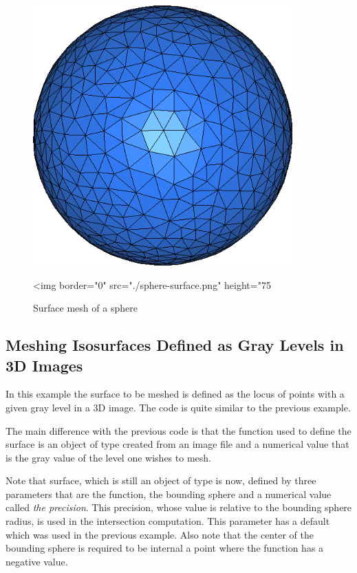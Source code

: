 \begin{figure}[ht]
  \begin{center}
    \begin{ccTexOnly}
      \includegraphics[height=10cm]{Surface_mesher/sphere-surface}
    \end{ccTexOnly}
    \begin{ccHtmlOnly}
      <img border="0" src="./sphere-surface.png" height="75%
    \end{ccHtmlOnly}
  \end{center}
  \caption{Surface mesh of a sphere}
  \label{figure:Surface_mesher-sphere-surface}
\end{figure}


\subsection{Meshing Isosurfaces Defined as Gray Levels in  3D Images}
In this example the surface to be meshed is defined
as the locus of points with a given gray level
in a 3D image.
The code is quite similar to the previous example.

The main difference with the previous code
is that the function used to define the surface
is  an object of type   created from
an image file and a numerical value that is  the
 gray value of the level one wishes to mesh.

Note that  surface, which is still an object of type  
is now, defined by three parameters that are the function, the bounding
sphere and a numerical value called {\em the precision}. This
precision, whose value
is relative to the bounding sphere radius, is used in the intersection
computation.
This parameter has a default which was used in the previous example.
Also note that the center of the bounding sphere is required to be
internal a point where the function has a negative value.

